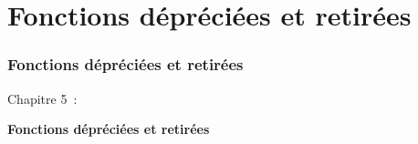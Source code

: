 %

\section{Fonctions dépréciées et retirées}
\begin{frame}[fragile]
	\frametitle{Fonctions dépréciées et retirées}

	\begin{center}\huge{Chapitre 5~:}\end{center}
	\begin{center}\huge{\color{typo3darkgrey}\textbf{Fonctions dépréciées et retirées}}\end{center}

\end{frame}

